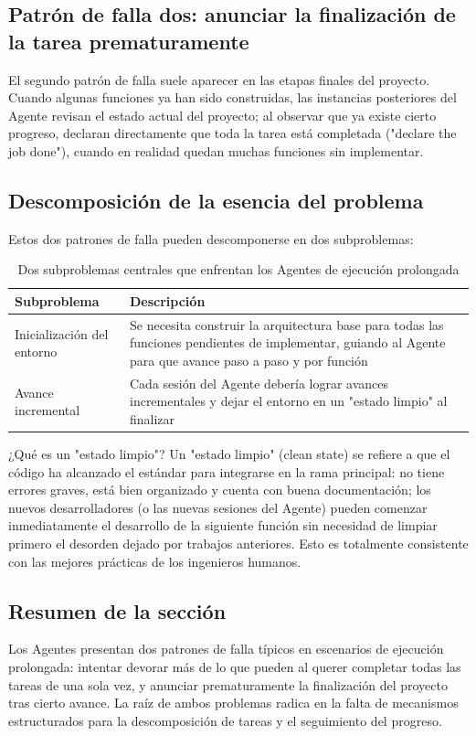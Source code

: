 \subsection{Patrón de falla dos: anunciar la finalización de la tarea prematuramente}

El segundo patrón de falla suele aparecer en las etapas finales del proyecto. Cuando algunas funciones ya han sido construidas, las instancias posteriores del Agente revisan el estado actual del proyecto; al observar que ya existe cierto progreso, declaran directamente que toda la tarea está completada ("declare the job done"), cuando en realidad quedan muchas funciones sin implementar.

\subsection{Descomposición de la esencia del problema}

Estos dos patrones de falla pueden descomponerse en dos subproblemas:

\begin{table}[H]
\centering
\begin{tabular}{p{4cm}p{9cm}}
\toprule
\textbf{Subproblema} & \textbf{Descripción} \\
\midrule
Inicialización del entorno & Se necesita construir la arquitectura base para todas las funciones pendientes de implementar, guiando al Agente para que avance paso a paso y por función \\
\midrule
Avance incremental & Cada sesión del Agente debería lograr avances incrementales y dejar el entorno en un "estado limpio" al finalizar \\
\bottomrule
\end{tabular}
\caption{Dos subproblemas centrales que enfrentan los Agentes de ejecución prolongada}
\end{table}

\begin{importantbox}{¿Qué es un "estado limpio"?}
Un "estado limpio" (clean state) se refiere a que el código ha alcanzado el estándar para integrarse en la rama principal: no tiene errores graves, está bien organizado y cuenta con buena documentación; los nuevos desarrolladores (o las nuevas sesiones del Agente) pueden comenzar inmediatamente el desarrollo de la siguiente función sin necesidad de limpiar primero el desorden dejado por trabajos anteriores. Esto es totalmente consistente con las mejores prácticas de los ingenieros humanos.
\end{importantbox}

\subsection{Resumen de la sección}

Los Agentes presentan dos patrones de falla típicos en escenarios de ejecución prolongada: intentar devorar más de lo que pueden al querer completar todas las tareas de una sola vez, y anunciar prematuramente la finalización del proyecto tras cierto avance. La raíz de ambos problemas radica en la falta de mecanismos estructurados para la descomposición de tareas y el seguimiento del progreso.


